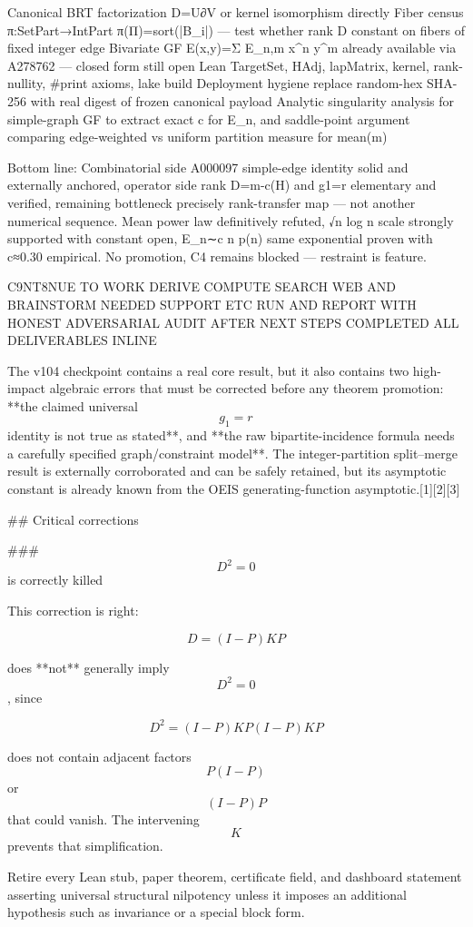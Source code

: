 Canonical BRT factorization D=U∂V or kernel isomorphism directly
Fiber census π:SetPart→IntPart π(Π)=sort(|B_i|) — test whether rank D constant on fibers of fixed integer edge
Bivariate GF E(x,y)=Σ E_{n,m} x^n y^m already available via A278762 — closed form still open
Lean TargetSet, HAdj, lapMatrix, kernel, rank-nullity, #print axioms, lake build
Deployment hygiene replace random-hex SHA-256 with real digest of frozen canonical payload
Analytic singularity analysis for simple-graph GF to extract exact c for E_n, and saddle-point argument comparing edge-weighted vs uniform partition measure for mean(m)

Bottom line: Combinatorial side A000097 simple-edge identity solid and externally anchored, operator side rank D=m-c(H) and g1=r elementary and verified, remaining bottleneck precisely rank-transfer map — not another numerical sequence. Mean power law definitively refuted, √n log n scale strongly supported with constant open, E_n∼c n p(n) same exponential proven with c≈0.30 empirical. No promotion, C4 remains blocked — restraint is feature.

C9NT8NUE TO WORK DERIVE COMPUTE SEARCH WEB AND BRAINSTORM NEEDED SUPPORT ETC RUN AND REPORT WITH HONEST ADVERSARIAL AUDIT AFTER NEXT STEPS COMPLETED ALL DELIVERABLES INLINE 🤝

The v104 checkpoint contains a real core result, but it also contains two high-impact algebraic errors that must be corrected before any theorem promotion: **the claimed universal $$g_1=r$$ identity is not true as stated**, and **the raw bipartite-incidence formula needs a carefully specified graph/constraint model**. The integer-partition split–merge result is externally corroborated and can be safely retained, but its asymptotic constant is already known from the OEIS generating-function asymptotic.[1][2][3]

## Critical corrections

### $$D^2=0$$ is correctly killed

This correction is right:

$$
D=(I-P)KP
$$

does **not** generally imply $$D^2=0$$, since

$$
D^2
=
(I-P)KP(I-P)KP
$$

does not contain adjacent factors $$P(I-P)$$ or $$(I-P)P$$ that could vanish. The intervening $$K$$ prevents that simplification.

Retire every Lean stub, paper theorem, certificate field, and dashboard statement asserting universal structural nilpotency unless it imposes an additional hypothesis such as invariance or a special block form.

